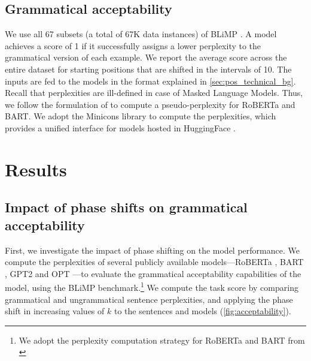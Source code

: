 \documentclass[letterpaper, 12pt]{report}
\begin{document}
\subsection{Grammatical acceptability}
We use all 67 subsets (a total of 67K data instances) of BLiMP \cite{warstadt-etal-2020-BLiMP-benchmark}. A model achieves a score of 1 if it successfully assigns a lower perplexity to the grammatical version of each example. We report the average score across the entire dataset for starting positions that are shifted in the intervals of 10.
The inputs are fed to the models in the format explained in \autoref{sec:pos_technical_bg}.
Recall that perplexities are ill-defined in case of Masked Language Models. Thus, we follow the formulation of \citet{salazar2019masked} to compute a pseudo-perplexity for RoBERTa and BART.
We adopt the Minicons \cite{misra2022minicons} library to compute the perplexities, which provides a unified interface for models hosted in HuggingFace \citep{huggingface}.




\section{Results}
\label{sec:pos_results}

\subsection{Impact of phase shifts on grammatical acceptability}
\label{sec:pos_acceptability}





First, we investigate the impact of phase shifting on the model performance.
We compute the perplexities of several publicly available models---RoBERTa \citep{Liu2019:RoBERTa}, BART \citep{Lewis2020:BART}, GPT2 \citep{Radford2019:GPT2} and OPT \citep{Zhang2022:OPT}---to evaluate the grammatical acceptability capabilities of the model, using the BLiMP \cite{warstadt-etal-2020-BLiMP-benchmark} benchmark.\footnote{We adopt the perplexity computation strategy for RoBERTa and BART from \citet{salazar2019masked}}
We compute the task score by comparing grammatical and ungrammatical sentence perplexities, and applying the phase shift in increasing values of $k$ to the sentences and models (\autoref{fig:acceptability}).
\end{document}
